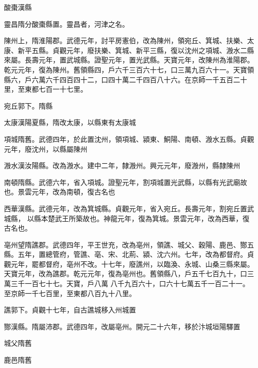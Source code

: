 \begin{pinyinscope}
 酸棗漢縣



 靈昌隋分酸棗縣置。靈昌者，河津之名。



 陳州上，隋淮陽郡。武德元年，討平房憲伯，改為陳州，領宛丘、箕城、扶樂、太康、新平五縣。貞觀元年，廢扶樂、箕城、新平三縣，復以沈州之項城、溵水二縣來屬。長壽元年，置武城縣。證聖元年，置光武縣。天寶元年，改陳州為淮陽郡。乾元元年，復為陳州。舊領縣四，戶六千三百六十七，口三萬九百六十一。天寶領縣六，戶六萬六千四百四十二，口四十萬二千四百八十六。在京師一千五百二十里，至東都七百一十七里。



 宛丘郭下。隋縣



 太康漢陽夏縣，隋改太康，以縣東有太康城



 項城隋舊。武德四年，於此置沈州，領項城、潁東、鮦陽、南頓、溵水五縣。貞觀元年，廢沈州，以縣屬陳州



 溵水漢汝陽縣。改為溵水。建中二年，隸溵州。興元元年，廢溵州，縣隸陳州



 南頓隋縣。武德六年，省入項城。證聖元年，割項城置光武縣，以縣有光武廟故也。景雲元年，改為南頓，復古名也



 西華漢縣。武德元年，改為箕城縣。貞觀元年，省入宛丘。長壽元年，割宛丘置武城縣，
 以縣本楚武王所築故也。神龍元年，復為箕城。景雲元年，改為西華，復古名也。



 亳州望隋譙郡。武德四年，平王世充，改為亳州，領譙、城父、穀陽、鹿邑、酂五縣。五年，置總管府，管譙、亳、宋、北荊、潁、沈六州。七年，改為都督府。貞觀元年，罷都督府，亳州不改。十七年，廢譙州，以臨渙、永城、山桑三縣來屬。天寶元年，改為譙郡。乾元元年，復為亳州也。舊領縣八，戶五千七百九十，口三萬三千一百七十七。天寶，戶八萬
 八千九百六十，口六十七萬五千一百二十一。至京師一千七百里，至東都八百九十八里。



 譙郭下。貞觀十七年，自古譙城移入州城置



 酂漢縣。隋屬沛郡。武德四年，改屬亳州。開元二十六年，移於汴城垣陽驛置



 城父隋舊



 鹿邑隋舊




\end{pinyinscope}
